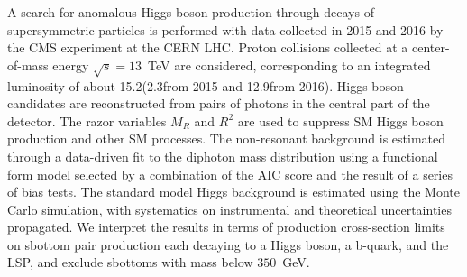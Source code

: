 A search for anomalous Higgs boson production through decays of supersymmetric particles is performed with
data collected in 2015 and 2016 by the CMS experiment at the CERN LHC. Proton collisions collected at a center-of-mass energy 
$\sqrt{s}=13$~TeV are considered, corresponding to an integrated luminosity of about 
15.2\fbinv (2.3\fbinv from 2015 and 12.9\fbinv from 2016). Higgs boson candidates are reconstructed from 
pairs of photons in the central part of the detector. The razor variables $M_{R}$ and $R^{2}$ are used to 
suppress SM Higgs boson production and other SM processes. The non-resonant background is estimated through a 
data-driven fit to the diphoton mass distribution using a functional form model selected
by a combination of the AIC score and the result of a series of bias tests. The standard model Higgs background
is estimated using the Monte Carlo simulation, with systematics on instrumental and theoretical uncertainties
propagated. We interpret the results in terms of production cross-section limits on sbottom pair production
each decaying to a Higgs boson, a b-quark, and the LSP, and exclude sbottoms with mass below $350$~GeV.

